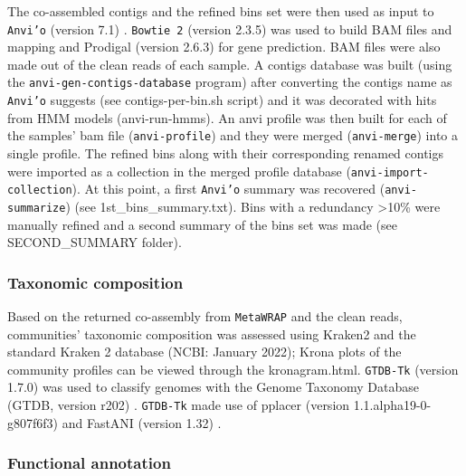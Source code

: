    The co-assembled contigs and the refined bins set were then used as input to \texttt{Anvi’o} (version 7.1) \citep{eren_anvio_2015}. 
   \texttt{Bowtie 2} (version 2.3.5) \citep{langmead_fast_2012} was used to build BAM files and mapping and Prodigal (version 2.6.3) \citep{hyatt_prodigal_2010} for gene prediction. 
   BAM files were also made out of the clean reads of each sample. 
   A contigs database was built (using the \texttt{anvi-gen-contigs-database} program) after converting the contigs name as \texttt{Anvi’o} suggests (see contigs-per-bin.sh script) and it was decorated with hits from HMM models (anvi-run-hmms). 
   An anvi profile was then built for each of the samples’ bam file (\texttt{anvi-profile}) and they were merged (\texttt{anvi-merge}) into a single profile. 
   The refined bins along with their corresponding renamed contigs were imported as a collection in the merged profile database (\texttt{anvi-import-collection}). 
   At this point, a first \texttt{Anvi’o} summary was recovered (\texttt{anvi-summarize}) (see 1st\_bins\_summary.txt). 
   Bins with a redundancy >10\% were manually refined and a second summary of the bins set was made (see SECOND\_SUMMARY folder). 


\subsubsection*{Taxonomic composition}

   Based on the returned co-assembly from \texttt{MetaWRAP} and the clean reads, communities’ taxonomic composition was assessed using  Kraken2 \citep{wood_improved_2019} and the standard Kraken 2 database (NCBI: January 2022); 
   Krona plots of the community profiles can be viewed through the kronagram.html. 
   \texttt{GTDB-Tk} (version 1.7.0) \citep{chaumeil_gtdb-tk_2020} was used to classify genomes with the Genome Taxonomy Database (GTDB, version r202) \citep{parks_gtdb_2022}. 
   \texttt{GTDB-Tk} made use of pplacer (version 1.1.alpha19-0-g807f6f3) \citep{matsen_pplacer_2010} and FastANI (version 1.32) \citep{jain_high_2018}.


\subsubsection*{Functional annotation}

